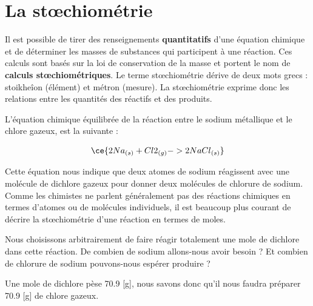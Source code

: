 \documentclass[
  11pt,
  a4paper,
  openany]{book}
\begin{document}
\hypertarget{la-stux153chiomuxe9trie}{%
\section{La stœchiométrie}\label{la-stux153chiomuxe9trie}}

Il est possible de tirer des renseignements \textbf{quantitatifs} d'une équation chimique et de déterminer les masses de substances qui participent à une réaction. Ces calculs sont basés sur la loi de conservation de la masse et portent le nom de \textbf{calculs stœchiométriques}. Le terme stœchiométrie dérive de deux mots grecs : stoikheîon (élément) et métron (mesure). La stœchiométrie exprime donc les relations entre les quantités des réactifs et des produits.

L'équation chimique équilibrée de la réaction entre le sodium métallique et le chlore gazeux, est la suivante :

\[ \ce{ 2 Na{}_{(s)} + Cl2{}_{(g)} -> 2 NaCl{}_{(s)} } \]

Cette équation nous indique que deux atomes de sodium réagissent avec une molécule de dichlore gazeux pour donner deux molécules de chlorure de sodium. Comme les chimistes ne parlent généralement pas des réactions chimiques en termes d'atomes ou de molécules individuels, il est beaucoup plus courant de décrire la stœchiométrie d'une réaction en termes de moles.

Nous choisissons arbitrairement de faire réagir totalement une mole de dichlore dans cette réaction. De combien de sodium allons-nous avoir besoin ? Et combien de chlorure de sodium pouvons-nous espérer produire ?

Une mole de dichlore pèse 70.9 {[}g{]}, nous savons donc qu'il nous faudra préparer 70.9 {[}g{]} de chlore gazeux.
\end{document}
